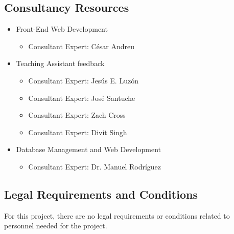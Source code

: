 \subsection{Consultancy Resources}
\begin{itemize}
\item Front-End Web Development
\begin{itemize}
\item Consultant Expert: César Andreu
\end{itemize}
\item Teaching Assistant feedback
\begin{itemize}
\item Consultant Expert: Jesús E. Luzón
\item Consultant Expert: José Santuche
\item Consultant Expert: Zach Cross
\item Consultant Expert: Divit Singh
\end{itemize}
\item Database Management and Web Development
\begin{itemize}
\item Consultant Expert: Dr. Manuel Rodríguez
\end{itemize}
\end{itemize}

\subsection{Legal Requirements and Conditions}

For this project, there are no legal requirements or conditions related to
personnel needed for the project.
